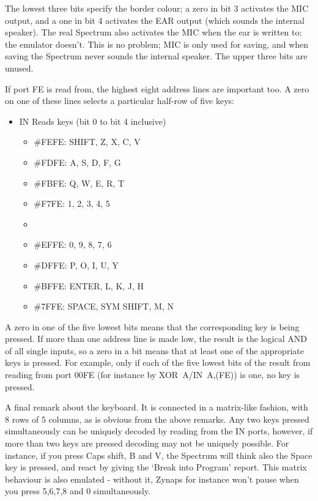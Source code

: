 \noindent
    The lowest three bits specify the border colour; a zero in bit 3
    activates the MIC output, and a one in bit 4 activates the EAR output
    (which sounds the internal speaker).  The real Spectrum also activates
    the MIC when the ear is written to; the emulator doesn't.  This is no
    problem; MIC is only used for saving, and when saving the Spectrum never
    sounds the internal speaker.  The upper three bits are unused.

    If port FE is read from, the highest eight address lines are important
    too.  A zero on one of these lines selects a particular half-row of five
    keys:
\begin{itemize}
  \item[] IN     Reads keys (bit 0 to bit 4 inclusive)
  \begin{itemize}
    \item[] \#FEFE:  SHIFT, Z, X, C, V
    \item[] \#FDFE:  A, S, D, F, G
    \item[] \#FBFE:  Q, W, E, R, T
    \item[] \#F7FE:  1, 2, 3, 4, 5 
    \item[]
    \item[] \#EFFE:  0, 9, 8, 7, 6
    \item[] \#DFFE:  P, O, I, U, Y
    \item[] \#BFFE:  ENTER, L, K, J, H
    \item[] \#7FFE:  SPACE, SYM SHIFT, M, N
  \end{itemize}
\end{itemize}
    A zero in one of the five lowest bits means that the corresponding key
    is being pressed.  If more than one address line is made low, the result
    is the logical AND of all single inputs, so a zero in a bit means that
    at least one of the appropriate keys is pressed.  For example, only if
    each of the five lowest bits of the result from reading from port 00FE
    (for instance by XOR~A/IN~A,(FE)) is one, no key is pressed.

    A final remark about the keyboard.  It is connected in a matrix-like
    fashion, with 8 rows of 5 columns, as is obvious from the above remarks.
    Any two keys pressed simultaneously can be uniquely decoded by reading
    from the IN ports, however, if more than two keys are pressed decoding
    may not be uniquely possible.  For instance, if you press Caps shift, B
    and V, the Spectrum will think also the Space key is pressed, and react
    by giving the `Break into Program' report.  This matrix behaviour is
    also emulated - without it, Zynaps for instance won't pause when you
    press 5,6,7,8 and 0 simultaneously.

